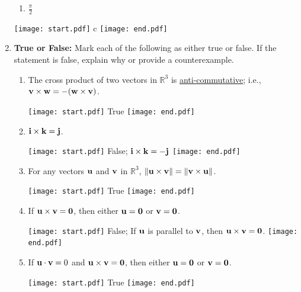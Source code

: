 \documentclass[12pt]{article}
\begin{document}
\begin{enumerate}
\begin{enumerate}
\item $\frac{\pi}{2}$

\end{enumerate}

\texttt{[image: start.pdf]}
{{c}}
\texttt{[image: end.pdf]}


\item {\bf True or False:}  Mark each of the following as either true or false. If the statement is false, explain why or provide a counterexample.

\begin{enumerate}

\item The cross product of two vectors in $\mathbb{R}^3$ is \underline{anti-commutative}; i.e., ${\bf v}\times{\bf w}=-({\bf w}\times{\bf v})$.

\texttt{[image: start.pdf]}
{{True}}
\texttt{[image: end.pdf]}


\item ${\bf i}\times{\bf k}={\bf j}$.

\texttt{[image: start.pdf]}
{{False; ${\bf i}\times{\bf k}=-{\bf j}$}}
\texttt{[image: end.pdf]}


\item For any vectors ${\bf u}$ and ${\bf v}$ in $\mathbb{R}^3$, $\|{\bf u}\times{\bf v}\|=\|{\bf v}\times{\bf u}\|$.

\texttt{[image: start.pdf]}
{{True}}
\texttt{[image: end.pdf]}


\item If ${\bf u}\times{\bf v}={\bf 0}$, then either ${\bf u}={\bf 0}$ or ${\bf v}={\bf 0}$.

\texttt{[image: start.pdf]}
{{False; If ${\bf u}$ is parallel to ${\bf v}$, then ${\bf u}\times{\bf v}={\bf 0}$.}}
\texttt{[image: end.pdf]}


\item If ${\bf u}\cdot {\bf v}=0$ and ${\bf u}\times{\bf v}={\bf 0}$, then either ${\bf u}={\bf 0}$ or ${\bf v}={\bf 0}$.

\texttt{[image: start.pdf]}
{{True}}
\texttt{[image: end.pdf]}


\end{enumerate}

\end{enumerate}
\end{document}
